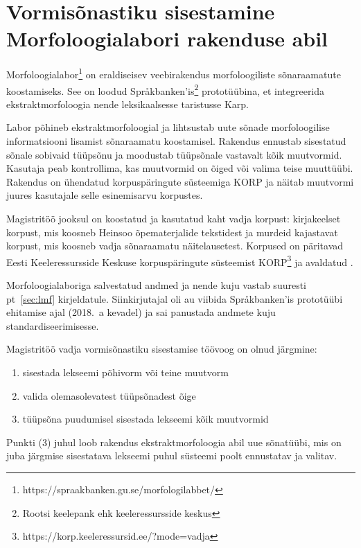 \documentclass[12pt,a4paper]{article}
\begin{document}
\newpage

\section{Vormisõnastiku sisestamine Morfoloogialabori rakenduse abil}
\label{sec:vormisõnastiku-sisestamine}

Morfoloogialabor\footnote{https://spraakbanken.gu.se/morfologilabbet/} on eraldiseisev veebi\-rakendus morfoloogiliste sõnaraamatute koostamiseks. See on loodud Språkbanken'is\footnote{Rootsi keelepank ehk keele\-ressursside keskus} prototüübina, et integreerida ekstraktmorfoloogia nende leksikaalsesse taristusse Karp.

Labor põhineb ekstraktmorfoloogial ja lihtsustab uute sõnade morfoloogilise informatsiooni lisamist sõnaraamatu koostamisel. Rakendus ennustab sisestatud sõnale sobivaid tüüpsõnu ja moodustab tüüpsõnale vastavalt kõik muutvormid. Kasutaja peab kontrollima, kas muutvormid on õiged või valima teise muuttüübi.  Rakendus on ühendatud korpuspäringute süsteemiga KORP ja näitab muutvormi juures kasutajale selle esinemis\-arvu korpustes. %

Magistritöö jooksul on koostatud ja kasutatud kaht vadja korpust: kirjakeelset korpust, mis koosneb Heinsoo õpematerjalide tekstidest ja murdeid kajastavat korpust, mis koosneb vadja sõnaraamatu \cite{grunberg_vadja_2013} näitelausetest. Korpused on päritavad Eesti Keeleressursside Keskuse korpuspäringute süsteemist KORP\footnote{https://korp.keeleressursid.ee/?mode=vadja} ja avaldatud \cite{kankainen_keeleleek/votic-corpora:_2018}.

Morfoloogialaboriga salvestatud andmed ja nende kuju vastab suuresti pt~\ref{sec:lmf} kirjeldatule. Siinkirjutajal oli au viibida Språkbanken'is prototüübi ehitamise ajal (2018.~a kevadel) ja sai panustada andmete kuju standardiseerimisesse.


Magistritöö vadja vormisõnastiku sisestamise töövoog on olnud järgmine:
\begin{enumerate}
\item sisestada lekseemi põhivorm või teine muutvorm
\item valida olemasolevatest tüüpsõnadest õige
\item tüüpsõna puudumisel sisestada lekseemi kõik muutvormid
\end{enumerate}

Punkti (3) juhul loob rakendus ekstrakt\-morfoloogia abil uue sõnatüübi, mis on juba järgmise sisestatava lekseemi puhul süsteemi poolt ennustatav ja valitav.
\end{document}
